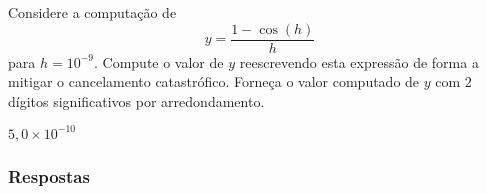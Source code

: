 \begin{exer}\label{exer:cancela_1}
  Considere a computação de
  \begin{equation}
    y = \frac{1 - \cos(h)}{h}
  \end{equation}
para $h=10^{-9}$. Compute o valor de $y$ reescrevendo esta expressão de forma a mitigar o cancelamento catastrófico. Forneça o valor computado de $y$ com $2$ dígitos significativos por arredondamento.
\end{exer}
\begin{resp}
  $5,0\times 10^{-10}$
\end{resp}

\ifisbook
\subsubsection{Respostas}
\shipoutAnswer
\fi

